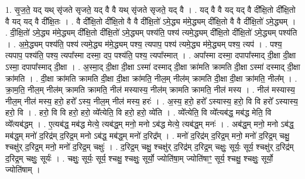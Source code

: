 \documentclass[17pt]{extarticle}
\begin{document}
1. सृ॒ज॒ते॒ यद् यथ् सृ॑जते सृजते॒ यद् वै वै यथ् सृ॑जते सृजते॒ यद् वै । . यद् वै वै यद् यद् वै दी᳚क्षि॒तो दी᳚क्षि॒तो वै यद् यद् वै दी᳚क्षि॒तः । . वै दी᳚क्षि॒तो दी᳚क्षि॒तो वै वै दी᳚क्षि॒तो॑ ऽमे॒द्ध्य म॑मे॒द्ध्यम् दी᳚क्षि॒तो वै वै दी᳚क्षि॒तो॑ ऽमे॒द्ध्यम् । . दी॒क्षि॒तो॑ ऽमे॒द्ध्य म॑मे॒द्ध्यम् दी᳚क्षि॒तो दी᳚क्षि॒तो॑ ऽमे॒द्ध्यम् पश्य॑ति॒ पश्य॑ त्यमे॒द्ध्यम् दी᳚क्षि॒तो दी᳚क्षि॒तो॑ ऽमे॒द्ध्यम् पश्य॑ति । . अ॒मे॒द्ध्यम् पश्य॑ति॒ पश्य॑ त्यमे॒द्ध्य म॑मे॒द्ध्यम् पश्य॒ त्यपाप॒ पश्य॑ त्यमे॒द्ध्य म॑मे॒द्ध्यम् पश्य॒ त्यप॑ । . पश्य॒ त्यपाप॒ पश्य॑ति॒ पश्य॒ त्यपा᳚स्मा दस्मा॒ दप॒ पश्य॑ति॒ पश्य॒ त्यपा᳚स्मात् । . अपा᳚स्मा दस्मा॒ दपापा᳚स्माद् दी॒क्षा दी॒क्षा ऽस्मा॒ दपापा᳚स्माद् दी॒क्षा । . अ॒स्मा॒द् दी॒क्षा दी॒क्षा ऽस्मा॑ दस्माद् दी॒क्षा क्रा॑मति क्रामति दी॒क्षा ऽस्मा॑ दस्माद् दी॒क्षा क्रा॑मति । . दी॒क्षा क्रा॑मति क्रामति दी॒क्षा दी॒क्षा क्रा॑मति॒ नील॒म् नील॑म् क्रामति दी॒क्षा दी॒क्षा क्रा॑मति॒ नील᳚म् । . क्रा॒म॒ति॒ नील॒म् नील॑म् क्रामति क्रामति॒ नील॑ मस्यास्य॒ नील॑म् क्रामति क्रामति॒ नील॑ मस्य । . नील॑ मस्यास्य॒ नील॒म् नील॑ मस्य॒ हरो॒ हरो᳚ ऽस्य॒ नील॒म् नील॑ मस्य॒ हरः॑ । . अ॒स्य॒ हरो॒ हरो᳚ ऽस्यास्य॒ हरो॒ वि वि हरो᳚ ऽस्यास्य॒ हरो॒ वि । . हरो॒ वि वि हरो॒ हरो॒ व्ये᳚त्येति॒ वि हरो॒ हरो॒ व्ये॑ति । . व्ये᳚त्येति॒ वि व्ये᳚त्यब॑द्ध॒ मब॑द्ध मेति॒ वि व्ये᳚त्यब॑द्धम् । . ए॒त्यब॑द्ध॒ मब॑द्ध मेत्ये॒ त्यब॑द्ध॒म् मनो॒ मनो ऽब॑द्ध मेत्ये॒ त्यब॑द्ध॒म् मनः॑ । . अब॑द्ध॒म् मनो॒ मनो ऽब॑द्ध॒ मब॑द्ध॒म् मनो॑ द॒रिद्र॑म् द॒रिद्र॒म् मनो ऽब॑द्ध॒ मब॑द्ध॒म् मनो॑ द॒रिद्र᳚म् । . मनो॑ द॒रिद्र॑म् द॒रिद्र॒म् मनो॒ मनो॑ द॒रिद्र॒म् चक्षु॒ श्चक्षु॑र् द॒रिद्र॒म् मनो॒ मनो॑ द॒रिद्र॒म् चक्षुः॑ । . द॒रिद्र॒म् चक्षु॒ श्चक्षु॑र् द॒रिद्र॑म् द॒रिद्र॒म् चक्षुः॒ सूर्यः॒ सूर्य॒ श्चक्षु॑र् द॒रिद्र॑म् द॒रिद्र॒म् चक्षुः॒ सूर्यः॑ । . चक्षुः॒ सूर्यः॒ सूर्य॒ श्चक्षु॒ श्चक्षुः॒ सूर्यो॒ ज्योति॑षा॒म् ज्योति॑षाꣳ॒॒ सूर्य॒ श्चक्षु॒ श्चक्षुः॒ सूर्यो॒ ज्योति॑षाम् । \newline
\end{document}
